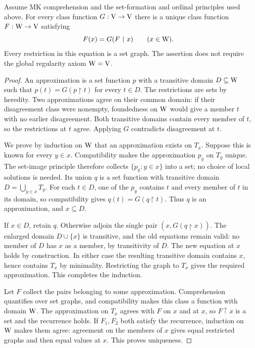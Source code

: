 \begin{theorem}
\label{thm:membership_recursion_on_W}
Assume MK comprehension and the set-formation and ordinal principles used
above. For every class function $G:\mathrm{V}\to\mathrm{V}$ there is a unique class
function $F:\mathrm{W}\to\mathrm{V}$ satisfying
\[
F(x)=G(F\restriction x)\qquad(x\in\mathrm{W}).
\]
Every restriction in this equation is a set graph. The assertion does not
require the global regularity axiom $\mathrm{W}=\mathrm{V}$.
\end{theorem}
\begin{proof}
An approximation is a set function $p$ with a transitive domain
$D\subseteq\mathrm{W}$ such that
$p(t)=G(p\restriction t)$ for every $t\in D$. The restrictions are sets
by heredity. Two approximations agree on their common domain: if their
disagreement class were nonempty, foundedness on $\mathrm{W}$ would give a
member $t$ with no earlier disagreement. Both transitive domains contain
every member of $t$, so the restrictions at $t$ agree. Applying $G$
contradicts disagreement at $t$.

We prove by induction on $\mathrm{W}$ that an approximation exists on $T_x$.
Suppose this is known for every $y\in x$. Compatibility makes the
approximation $p_y$ on $T_y$ unique. The set-image principle therefore
collects $\{p_y:y\in x\}$ into a set; no choice of local solutions is
needed. Its union $q$ is a set function with transitive domain
$D=\bigcup_{y\in x}T_y$. For each $t\in D$, one of the $p_y$ contains
$t$ and every member of $t$ in its domain, so compatibility gives
$q(t)=G(q\restriction t)$. Thus $q$ is an approximation, and $x\subseteq D$.

If $x\in D$, retain $q$. Otherwise adjoin the single pair
$(x,G(q\restriction x))$. The enlarged domain $D\cup\{x\}$ is
transitive, and the old equations remain valid: no member of $D$ has
$x$ as a member, by transitivity of $D$. The new equation at $x$ holds
by construction. In either case the resulting transitive domain contains
$x$, hence contains $T_x$ by minimality. Restricting the graph to $T_x$
gives the required approximation. This completes the induction.

Let $F$ collect the pairs belonging to some approximation. Comprehension
quantifies over set graphs, and compatibility makes this class a function
with domain $\mathrm{W}$. The approximation on $T_x$ agrees with $F$ on $x$
and at $x$, so $F\restriction x$ is a set and the recurrence holds.
If $F_1,F_2$ both satisfy the recurrence, induction on $\mathrm{W}$ makes them
agree: agreement on the members of $x$ gives equal restricted graphs and
then equal values at $x$. This proves uniqueness.
\end{proof}

